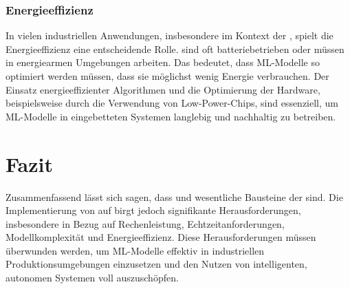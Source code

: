 \subsubsection{Energieeffizienz}

In vielen industriellen Anwendungen, insbesondere im Kontext der \Iviernull, spielt die Energieeffizienz eine entscheidende Rolle. 
\Emb sind oft batteriebetrieben oder müssen in energiearmen Umgebungen arbeiten. Das bedeutet, dass ML-Modelle so 
optimiert werden müssen, dass sie möglichst wenig Energie verbrauchen. Der Einsatz energieeffizienter Algorithmen und die Optimierung 
der Hardware, beispielsweise durch die Verwendung von Low-Power-Chips, sind essenziell, um ML-Modelle in eingebetteten Systemen 
langlebig und nachhaltig zu betreiben.

\section{Fazit}

Zusammenfassend lässt sich sagen, dass \Emb und \ML wesentliche Bausteine der \Iviernull sind. 
Die Implementierung von \ML auf \Emb birgt jedoch signifikante Herausforderungen, insbesondere in Bezug auf 
Rechenleistung, Echtzeitanforderungen, Modellkomplexität und Energieeffizienz. Diese Herausforderungen müssen überwunden werden, 
um ML-Modelle effektiv in industriellen Produktionsumgebungen einzusetzen und den Nutzen von intelligenten, autonomen Systemen 
voll auszuschöpfen.